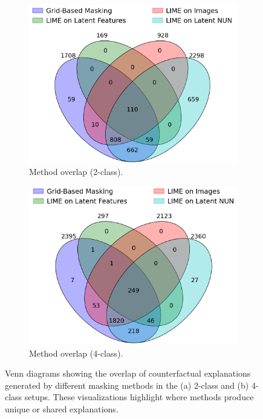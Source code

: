 \begin{figure}[htbp]
    \centering
    \begin{subfigure}{0.45\textwidth}
        \centering
        \includegraphics[width=\textwidth]{img/masking_results/venn_2_class.png}
        \caption{Method overlap (2-class).}
        \label{fig:venn_binary}
    \end{subfigure}
    \hfill
    \begin{subfigure}{0.45\textwidth}
        \centering
        \includegraphics[width=\textwidth]{img/masking_results/venn_4_class.png}
        \caption{Method overlap (4-class).}
        \label{fig:venn_multi}
    \end{subfigure}
    \caption[Overlap of counterfactuals per method using Venn diagrams]{%
Venn diagrams showing the overlap of counterfactual explanations generated by different masking methods in the (a) 2-class and (b) 4-class setups. These visualizations highlight where methods produce unique or shared explanations.}
    \label{fig:venn_comparison}
\end{figure}



